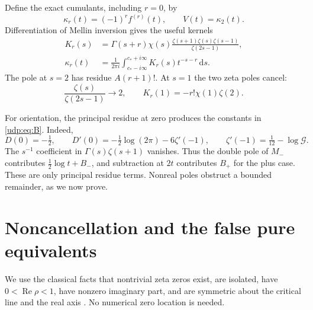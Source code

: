 \documentclass[11pt]{article}
\theoremstyle{remark}\newtheorem{remark}[theorem]{Remark}
\DeclareMathOperator{\Rea}{Re}
\newcommand{\dd}{\,\mathrm d}
\newcommand{\Gla}{\mathcal G}
\newcommand{\ch}{\chi}
\numberwithin{equation}{section}
\begin{document}
Define the exact cumulants, including $r=0$, by
\begin{equation}\label{udp:eq:kappa}
 \kappa_r(t)=(-1)^r f^{(r)}(t),\qquad V(t)=\kappa_2(t).
\end{equation}
Differentiation of Mellin inversion gives the useful kernels
\begin{align}
 K_r(s)&=\Gamma(s+r)\ch(s)
 \frac{\zeta(s+1)\zeta(s)\zeta(s-1)}{\zeta(2s-1)},\label{udp:eq:Kr}\\
 \kappa_r(t)&=\frac1{2\pi i}\int_{c_*-i\infty}^{c_*+i\infty}
 K_r(s)t^{-s-r}\dd s.\label{udp:eq:invM}
\end{align}
The pole at $s=2$ has residue $A(r+1)!$. At $s=1$ the two zeta poles cancel:
\begin{equation}\label{udp:eq:cancel1}
 \frac{\zeta(s)}{\zeta(2s-1)}\longrightarrow2,
 \qquad K_r(1)=-r!\ch(1)\zeta(2).
\end{equation}

For orientation, the principal residue at zero produces the constants in \eqref{udp:eq:B}. Indeed,
\[
 D(0)=-\tfrac12,\qquad
 D'(0)=-\tfrac12\log(2\pi)-6\zeta'(-1),\qquad
 \zeta'(-1)=\tfrac1{12}-\log\Gla.
\]
The $s^{-1}$ coefficient in $\Gamma(s)\zeta(s+1)$ vanishes. Thus the double pole of $M_-$ contributes $\tfrac12\log t+B_-$, and subtraction at $2t$ contributes $B_+$ for the plus case. These are only principal residue terms. Nonreal poles obstruct a bounded remainder, as we now prove.

\section{Noncancellation and the false pure equivalents}\label{udp:sec:refutation}
We use the classical facts that nontrivial zeta zeros exist, are isolated, have $0<\Rea\rho<1$, have nonzero imaginary part, and are symmetric about the critical line and the real axis \cite{dlmf}. No numerical zero location is needed.
\end{document}
